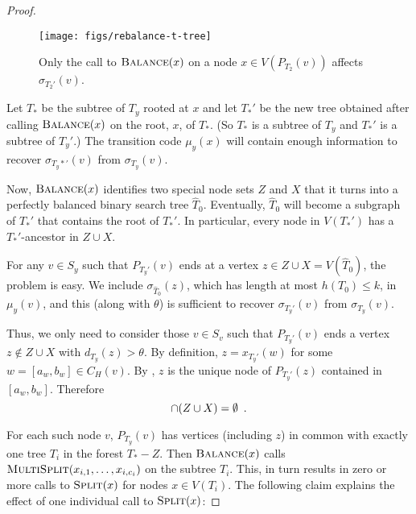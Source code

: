 \documentclass[kpfonts]{patmorin}
\let\le\leqslant
\begin{document}
\begin{proof}
  \begin{figure}
    \begin{center}
      \texttt{[image: figs/rebalance-t-tree]}
    \end{center}
    \caption{Only the call to $\textsc{Balance}(x)$ on a node $x\in V(P_{T_2}(v))$ affects $\sigma_{T_2'}(v)$.}
  \end{figure}
  
  Let $T_*$ be the subtree of $T_y$ rooted at $x$ and let $T_*'$ be the new tree obtained after calling $\textsc{Balance}(x)$ on the root, $x$, of $T_*$. (So $T_*$ is a subtree of $T_y$ and $T_*'$ is a subtree of $T_y'$.)
  The transition code $\mu_y(x)$ will contain enough information to recover $\sigma_{T_y*'}(v)$ from $\sigma_{T_y}(v)$. 
  
  Now, $\textsc{Balance}(x)$ identifies two special node sets $Z$ and $X$ that it turns into a perfectly balanced binary search tree $\hat{T}_0$.  Eventually, $\hat{T}_0$ will become a subgraph of $T_*'$ that contains the root of $T_*'$.   In particular, every node in $V(T_*')$ has a $T_*'$-ancestor in $Z\cup X$.
  
  For any $v\in S_y$ such that $P_{T_y'}(v)$ ends at a vertex $z\in Z\cup X=V(\hat{T}_0)$, the problem is easy.  We include $\sigma_{\hat{T}_0}(z)$, which has length at most $h(T_0)\le k$, in $\mu_y(v)$, and this (along with $\theta$) is sufficient to recover $\sigma_{T_y'}(v)$ from $\sigma_{T_y}(v)$.

  Thus, we only need to consider those $v\in S_v$ such that $P_{T_y'}(v)$ ends a vertex $z\not\in Z\cup X$ with $d_{T_y}(z)>\theta$.    By definition,  $z=x_{T_y'}(w)$ for some $w=[a_w,b_w]\in C_H(v)$.  By , $z$ is the unique node of $P_{T_y'}(z)$ contained in $[a_w,b_w]$.  Therefore
  \begin{equation}  
    [a_w,b_w]\cap (Z\cup X)=\emptyset \enspace . \eqlabel{empty}
  \end{equation}
  
  For each such node $v$, $P_{T_y}(v)$ has vertices (including $z$) in common with exactly one tree $T_{i}$ in the forest $T_*-Z$.  Then $\textsc{Balance}(x)$ calls $\textsc{MultiSplit}(x_{i,1},\ldots,x_{i,c_i})$ on the subtree $T_{i}$.  This, in turn results in zero or more calls to $\textsc{Split}(x)$ for nodes $x\in V(T_{i})$. The following claim explains the effect of one individual call to $\textsc{Split}(x)$:
  

\end{proof}
\end{document}
